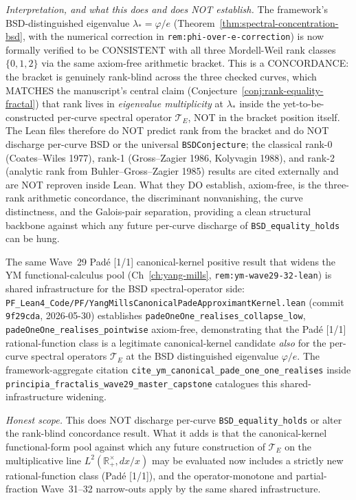 \begin{remark}
\begin{itemize}
\end{itemize}
\emph{Interpretation, and what this does and does NOT establish.} The framework's BSD-distinguished eigenvalue $\lambda_* = \varphi/e$ (Theorem~\ref{thm:spectral-concentration-bsd}, with the numerical correction in \texttt{rem:phi-over-e-correction}) is now formally verified to be CONSISTENT with all three Mordell-Weil rank classes $\{0, 1, 2\}$ via the same axiom-free arithmetic bracket. This is a CONCORDANCE: the bracket is genuinely rank-blind across the three checked curves, which MATCHES the manuscript's central claim (Conjecture~\ref{conj:rank-equality-fractal}) that rank lives in \emph{eigenvalue multiplicity} at $\lambda_*$ inside the yet-to-be-constructed per-curve spectral operator $\mathcal{T}_E$, NOT in the bracket position itself. The Lean files therefore do NOT predict rank from the bracket and do NOT discharge per-curve BSD or the universal \texttt{BSDConjecture}; the classical rank-0 (Coates--Wiles 1977), rank-1 (Gross--Zagier 1986, Kolyvagin 1988), and rank-2 (analytic rank from Buhler--Gross--Zagier 1985) results are cited externally and are NOT reproven inside Lean. What they DO establish, axiom-free, is the three-rank arithmetic concordance, the discriminant nonvanishing, the curve distinctness, and the Galois-pair separation, providing a clean structural backbone against which any future per-curve discharge of \texttt{BSD\_equality\_holds} can be hung.
\end{remark}

\begin{remark}\label{rem:bsd-wave29-lean}
The same Wave~29 Padé [1/1] canonical-kernel positive result that widens the YM functional-calculus pool (Ch~\ref{ch:yang-mills}, \texttt{rem:ym-wave29-32-lean}) is shared infrastructure for the BSD spectral-operator side: \texttt{PF\_Lean4\_Code/PF/YangMillsCanonicalPadeApproximantKernel.lean} (commit \texttt{9f29cda}, 2026-05-30) establishes \texttt{padeOneOne\_realises\_collapse\_low}, \texttt{padeOneOne\_realises\_pointwise} axiom-free, demonstrating that the Padé [1/1] rational-function class is a legitimate canonical-kernel candidate \emph{also} for the per-curve spectral operators $\mathcal{T}_E$ at the BSD distinguished eigenvalue $\varphi/e$. The framework-aggregate citation \texttt{cite\_ym\_canonical\_pade\_one\_one\_realises} inside \texttt{principia\_fractalis\_wave29\_master\_capstone} catalogues this shared-infrastructure widening.

\emph{Honest scope.} This does NOT discharge per-curve \texttt{BSD\_equality\_holds} or alter the rank-blind concordance result. What it adds is that the canonical-kernel functional-form pool against which any future construction of $\mathcal{T}_E$ on the multiplicative line $L^2(\mathbb{R}_+^\times, dx/x)$ may be evaluated now includes a strictly new rational-function class (Padé [1/1]), and the operator-monotone and partial-fraction Wave~31--32 narrow-outs apply by the same shared infrastructure.
\end{remark}

